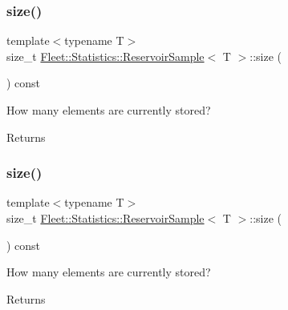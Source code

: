 \subsubsection{\texorpdfstring{size()}{size()}\hspace{0.1cm}{\footnotesize\ttfamily [1/2]}}
{\footnotesize\ttfamily template$<$typename T$>$ \\
size\+\_\+t \hyperlink{class_fleet_1_1_statistics_1_1_reservoir_sample}{Fleet\+::\+Statistics\+::\+Reservoir\+Sample}$<$ T $>$\+::size (\begin{DoxyParamCaption}{ }\end{DoxyParamCaption}) const\hspace{0.3cm}{\ttfamily [inline]}}

How many elements are currently stored? \begin{DoxyReturn}{Returns}

\end{DoxyReturn}
\mbox{\label{class_fleet_1_1_statistics_1_1_reservoir_sample_abdfad455c8b8da8cb2ab30d0f60053e0}} 
\subsubsection{\texorpdfstring{size()}{size()}\hspace{0.1cm}{\footnotesize\ttfamily [2/2]}}
{\footnotesize\ttfamily template$<$typename T$>$ \\
size\+\_\+t \hyperlink{class_fleet_1_1_statistics_1_1_reservoir_sample}{Fleet\+::\+Statistics\+::\+Reservoir\+Sample}$<$ T $>$\+::size (\begin{DoxyParamCaption}{ }\end{DoxyParamCaption}) const\hspace{0.3cm}{\ttfamily [inline]}}

How many elements are currently stored? \begin{DoxyReturn}{Returns}

\end{DoxyReturn}
\mbox{\label{class_fleet_1_1_statistics_1_1_reservoir_sample_a385d8640b316ff2e75f5da30948d8a35}} 
